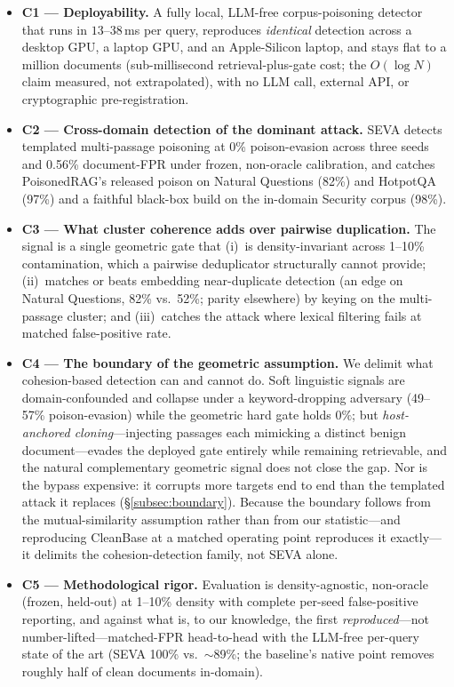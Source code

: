 \documentclass[10pt,journal,compsoc]{IEEEtran}
\begin{document}
\begin{itemize}
\item \textbf{C1 --- Deployability.} A fully local, LLM-free corpus-poisoning detector
that runs in $13$--$38$\,ms per query, reproduces \emph{identical} detection across a desktop
GPU, a laptop GPU, and an Apple-Silicon laptop, and stays flat to a million documents
(sub-millisecond retrieval-plus-gate cost; the $O(\log N)$ claim measured, not extrapolated),
with no LLM call, external API, or cryptographic pre-registration.

\item \textbf{C2 --- Cross-domain detection of the dominant attack.} SEVA detects templated
multi-passage poisoning at 0\% poison-evasion across three seeds and 0.56\% document-FPR under
frozen, non-oracle calibration, and catches PoisonedRAG's released poison on Natural Questions
(82\%) and HotpotQA (97\%) and a faithful black-box build on the in-domain Security corpus
(98\%).

\item \textbf{C3 --- What cluster coherence adds over pairwise duplication.} The signal is a
single geometric gate that (i)~is density-invariant across 1--10\% contamination, which a
pairwise deduplicator structurally cannot provide; (ii)~matches or beats embedding
near-duplicate detection (an edge on Natural Questions, 82\% vs.\ 52\%; parity elsewhere) by
keying on the multi-passage cluster; and (iii)~catches the attack where lexical filtering fails
at matched false-positive rate.

\item \textbf{C4 --- The boundary of the geometric assumption.} We delimit what cohesion-based
detection can and cannot do. Soft linguistic signals are domain-confounded and collapse under a
keyword-dropping adversary (49--57\% poison-evasion) while the geometric hard gate holds $0\%$;
but \emph{host-anchored cloning}---injecting passages each mimicking a distinct benign
document---evades the deployed gate entirely while remaining retrievable, and the natural
complementary geometric signal does not close the gap. Nor is the bypass expensive: it corrupts
more targets end to end than the templated attack it replaces (\S\ref{subsec:boundary}). Because
the boundary follows from the mutual-similarity assumption rather than from our statistic---and
reproducing CleanBase at a matched operating point reproduces it exactly---it delimits the
cohesion-detection family, not SEVA alone.

\item \textbf{C5 --- Methodological rigor.} Evaluation is density-agnostic, non-oracle (frozen,
held-out) at 1--10\% density with complete per-seed false-positive reporting, and against what
is, to our knowledge, the first \emph{reproduced}---not number-lifted---matched-FPR head-to-head
with the LLM-free per-query state of the art (SEVA 100\% vs.\ $\sim$89\%; the baseline's native
point removes roughly half of clean documents in-domain).


\end{itemize}
\end{document}
